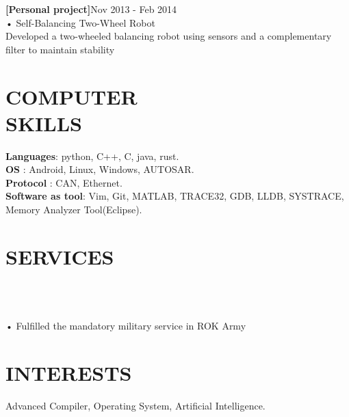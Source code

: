 \documentclass[margin]{res}
\begin{document}
\begin{resume}
\par
\textbf{[Personal project]}\hfill Nov 2013 - Feb 2014\\
• Self-Balancing Two-Wheel Robot\\
Developed a two-wheeled balancing robot using sensors and a complementary filter to maintain stability
\section{COMPUTER\\SKILLS}

\textbf{Languages}: python, C++, C, java, rust.\\
\textbf{OS} : Android, Linux, Windows, AUTOSAR.\\
\textbf{Protocol} : CAN, Ethernet.\\
\textbf{Software as tool}: Vim, Git, MATLAB, TRACE32, GDB, LLDB, SYSTRACE, Memory Analyzer Tool(Eclipse).\\

\section{SERVICES}
\begin{format}
    \\
    \body\\
    \end{format}

\begin{position}
    • Fulfilled the mandatory military service in ROK Army
\end{position}



\section{INTERESTS}
Advanced Compiler, Operating System, Artificial Intelligence.

\end{resume}
\end{document}
